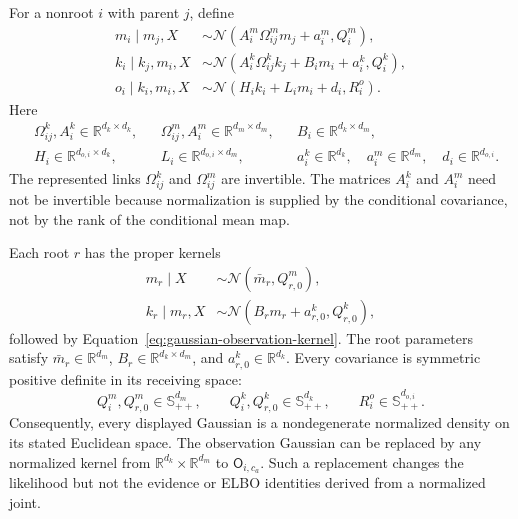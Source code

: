 For a nonroot \(i\) with parent \(j\), define
\begin{align}
m_i\mid m_j,X
&\sim\mathcal N\left(
A_i^m\Omega_{ij}^m m_j+a_i^m,
Q_i^m\right),
\label{eq:gaussian-model-transition}\\
k_i\mid k_j,m_i,X
&\sim\mathcal N\left(
A_i^k\Omega_{ij}^k k_j+B_i m_i+a_i^k,
Q_i^k\right),
\label{eq:gaussian-state-transition}\\
o_i\mid k_i,m_i,X
&\sim\mathcal N\left(
H_i k_i+L_i m_i+d_i,
R_i^o\right).
\label{eq:gaussian-observation-kernel}
\end{align}
Here
\begin{align}
&\Omega_{ij}^k,A_i^k\in\mathbb R^{d_k\times d_k},
&&\Omega_{ij}^m,A_i^m\in\mathbb R^{d_m\times d_m},
&&B_i\in\mathbb R^{d_k\times d_m},
\label{eq:gaussian-transition-shapes}\\
&H_i\in\mathbb R^{d_{o,i}\times d_k},
&&L_i\in\mathbb R^{d_{o,i}\times d_m},
&&a_i^k\in\mathbb R^{d_k},\quad a_i^m\in\mathbb R^{d_m},\quad d_i\in\mathbb R^{d_{o,i}}.
\label{eq:gaussian-observation-shapes}
\end{align}
The represented links \(\Omega_{ij}^k\) and \(\Omega_{ij}^m\) are invertible. The matrices \(A_i^k\) and \(A_i^m\) need not be invertible because normalization is supplied by the conditional covariance, not by the rank of the conditional mean map.

Each root \(r\) has the proper kernels
\begin{align}
m_r\mid X
&\sim\mathcal N\left(\bar m_r,Q_{r,0}^m\right),
\label{eq:gaussian-model-root}\\
k_r\mid m_r,X
&\sim\mathcal N\left(B_r m_r+a_{r,0}^k,Q_{r,0}^k\right),
\label{eq:gaussian-state-root}
\end{align}
followed by Equation~\eqref{eq:gaussian-observation-kernel}. The root parameters satisfy \(\bar m_r\in\mathbb R^{d_m}\), \(B_r\in\mathbb R^{d_k\times d_m}\), and \(a_{r,0}^k\in\mathbb R^{d_k}\). Every covariance is symmetric positive definite in its receiving space:
\begin{equation}
Q_i^m,Q_{r,0}^m\in\mathbb S_{++}^{d_m},
\qquad
Q_i^k,Q_{r,0}^k\in\mathbb S_{++}^{d_k},
\qquad
R_i^o\in\mathbb S_{++}^{d_{o,i}}.
\label{eq:gaussian-reference-spd-requirement}
\end{equation}
Consequently, every displayed Gaussian is a nondegenerate normalized density on its stated Euclidean space. The observation Gaussian can be replaced by any normalized kernel from \(\mathbb R^{d_k}\times\mathbb R^{d_m}\) to \(\mathsf O_{i,c_a}\). Such a replacement changes the likelihood but not the evidence or ELBO identities derived from a normalized joint.

